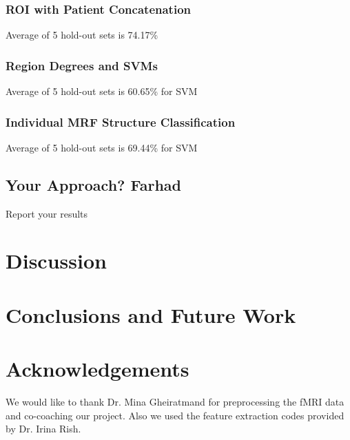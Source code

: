 \documentclass{article} %
\begin{document}
\subsubsection{ROI with Patient Concatenation}
Average of 5 hold-out sets is 74.17\%


\subsubsection{Region Degrees and SVMs}
Average of 5 hold-out sets is 60.65\% for SVM

\subsubsection{Individual MRF Structure Classification}
Average of 5 hold-out sets is 69.44\% for SVM

\subsection{Your Approach? Farhad}
Report your results

\section{Discussion}

\section{Conclusions and Future Work}

\section{Acknowledgements}
We would like to thank Dr. Mina Gheiratmand for preprocessing the fMRI data and co-coaching our project. Also we used the feature extraction codes provided by Dr. Irina Rish.



	
\end{document}

